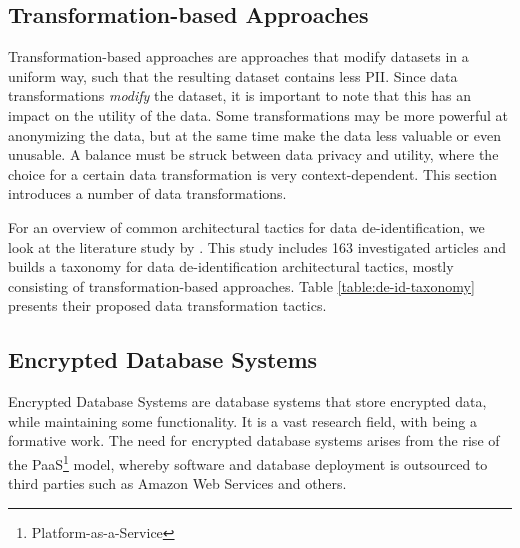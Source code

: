 \subsection{Transformation-based Approaches}
\label{sec:transformation-approaches}
Transformation-based approaches are approaches that modify datasets in a uniform way, such that the resulting dataset contains less \gls{PII}. Since data transformations \textit{modify} the dataset, it is important to note that this has an impact on the utility of the data. Some transformations may be more powerful at anonymizing the data, but at the same time make the data less valuable or even unusable. A balance must be struck between data privacy and utility, where the choice for a certain data transformation is very context-dependent. This section introduces a number of data transformations.

For an overview of common architectural tactics for data de-identification, we look at the literature study by \citeauthor{de-id-taxonomy}. This study includes 163 investigated articles and builds a taxonomy for data de-identification architectural tactics, mostly consisting of transformation-based approaches. Table \ref{table:de-id-taxonomy} presents their proposed data transformation tactics.
\newpage


\subsection{Encrypted Database Systems}
Encrypted Database Systems are database systems that store encrypted data, while maintaining some functionality. It is a vast research field, with \citet{sok-cryptdb} being a formative work. The need for encrypted database systems arises from the rise of the PaaS\footnote{Platform-as-a-Service} model, whereby software and database deployment is outsourced to third parties such as Amazon Web Services and others. 

